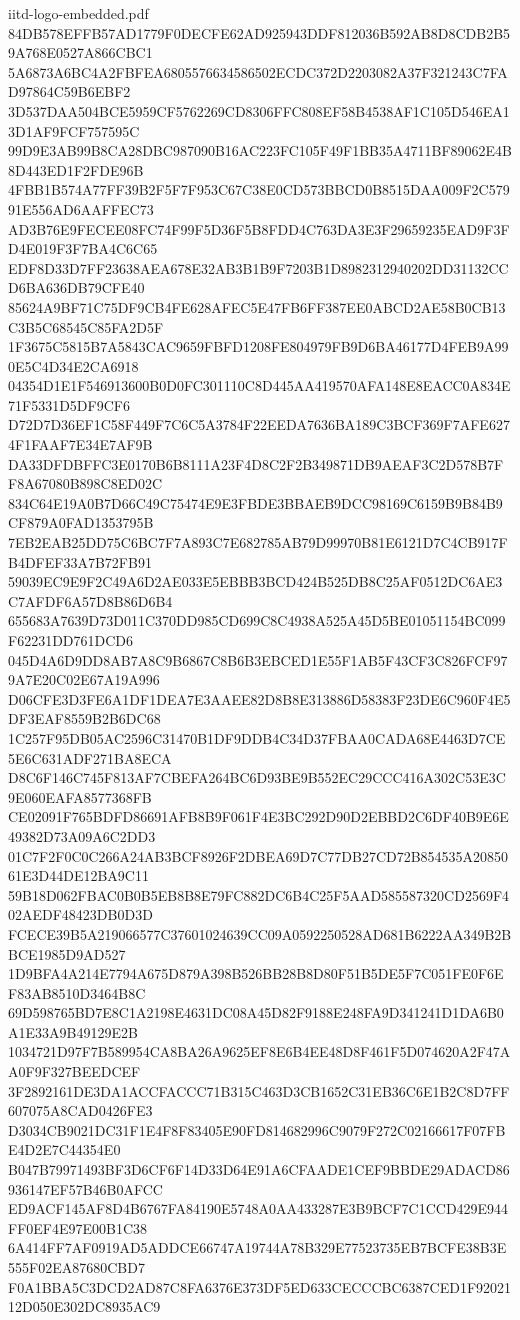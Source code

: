 \begin{filecontents*}[overwrite]{iitd-logo-embedded.pdf}
84DB578EFFB57AD1779F0DECFE62AD925943DDF812036B592AB8D8CDB2B59A768E0527A866CBC1
5A6873A6BC4A2FBFEA6805576634586502ECDC372D2203082A37F321243C7FAD97864C59B6EBF2
3D537DAA504BCE5959CF5762269CD8306FFC808EF58B4538AF1C105D546EA13D1AF9FCF757595C
99D9E3AB99B8CA28DBC987090B16AC223FC105F49F1BB35A4711BF89062E4B8D443ED1F2FDE96B
4FBB1B574A77FF39B2F5F7F953C67C38E0CD573BBCD0B8515DAA009F2C57991E556AD6AAFFEC73
AD3B76E9FECEE08FC74F99F5D36F5B8FDD4C763DA3E3F29659235EAD9F3FD4E019F3F7BA4C6C65
EDF8D33D7FF23638AEA678E32AB3B1B9F7203B1D8982312940202DD31132CCD6BA636DB79CFE40
85624A9BF71C75DF9CB4FE628AFEC5E47FB6FF387EE0ABCD2AE58B0CB13C3B5C68545C85FA2D5F
1F3675C5815B7A5843CAC9659FBFD1208FE804979FB9D6BA46177D4FEB9A990E5C4D34E2CA6918
04354D1E1F546913600B0D0FC301110C8D445AA419570AFA148E8EACC0A834E71F5331D5DF9CF6
D72D7D36EF1C58F449F7C6C5A3784F22EEDA7636BA189C3BCF369F7AFE6274F1FAAF7E34E7AF9B
DA33DFDBFFC3E0170B6B8111A23F4D8C2F2B349871DB9AEAF3C2D578B7FF8A67080B898C8ED02C
834C64E19A0B7D66C49C75474E9E3FBDE3BBAEB9DCC98169C6159B9B84B9CF879A0FAD1353795B
7EB2EAB25DD75C6BC7F7A893C7E682785AB79D99970B81E6121D7C4CB917FB4DFEF33A7B72FB91
59039EC9E9F2C49A6D2AE033E5EBBB3BCD424B525DB8C25AF0512DC6AE3C7AFDF6A57D8B86D6B4
655683A7639D73D011C370DD985CD699C8C4938A525A45D5BE01051154BC099F62231DD761DCD6
045D4A6D9DD8AB7A8C9B6867C8B6B3EBCED1E55F1AB5F43CF3C826FCF979A7E20C02E67A19A996
D06CFE3D3FE6A1DF1DEA7E3AAEE82D8B8E313886D58383F23DE6C960F4E5DF3EAF8559B2B6DC68
1C257F95DB05AC2596C31470B1DF9DDB4C34D37FBAA0CADA68E4463D7CE5E6C631ADF271BA8ECA
D8C6F146C745F813AF7CBEFA264BC6D93BE9B552EC29CCC416A302C53E3C9E060EAFA8577368FB
CE02091F765BDFD86691AFB8B9F061F4E3BC292D90D2EBBD2C6DF40B9E6E49382D73A09A6C2DD3
01C7F2F0C0C266A24AB3BCF8926F2DBEA69D7C77DB27CD72B854535A2085061E3D44DE12BA9C11
59B18D062FBAC0B0B5EB8B8E79FC882DC6B4C25F5AAD585587320CD2569F402AEDF48423DB0D3D
FCECE39B5A219066577C37601024639CC09A0592250528AD681B6222AA349B2BBCE1985D9AD527
1D9BFA4A214E7794A675D879A398B526BB28B8D80F51B5DE5F7C051FE0F6EF83AB8510D3464B8C
69D598765BD7E8C1A2198E4631DC08A45D82F9188E248FA9D341241D1DA6B0A1E33A9B49129E2B
1034721D97F7B589954CA8BA26A9625EF8E6B4EE48D8F461F5D074620A2F47AA0F9F327BEEDCEF
3F2892161DE3DA1ACCFACCC71B315C463D3CB1652C31EB36C6E1B2C8D7FF607075A8CAD0426FE3
D3034CB9021DC31F1E4F8F83405E90FD814682996C9079F272C02166617F07FBE4D2E7C44354E0
B047B79971493BF3D6CF6F14D33D64E91A6CFAADE1CEF9BBDE29ADACD86936147EF57B46B0AFCC
ED9ACF145AF8D4B6767FA84190E5748A0AA433287E3B9BCF7C1CCD429E944FF0EF4E97E00B1C38
6A414FF7AF0919AD5ADDCE66747A19744A78B329E77523735EB7BCFE38B3E555F02EA87680CBD7
F0A1BBA5C3DCD2AD87C8FA6376E373DF5ED633CECCCBC6387CED1F9202112D050E302DC8935AC9

\end{filecontents*}
